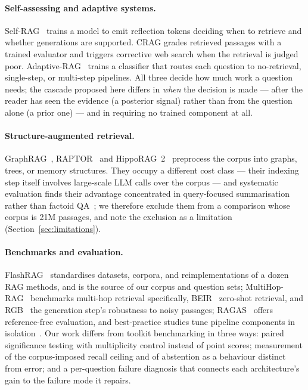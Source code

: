 \paragraph{Self-assessing and adaptive systems.}
Self-RAG~\cite{asai2024selfrag} trains a model to emit reflection tokens
deciding when to retrieve and whether generations are supported. CRAG
\cite{yan2024crag} grades retrieved passages with a trained evaluator and
triggers corrective web search when the retrieval is judged poor.
Adaptive-RAG~\cite{jeong2024adaptiverag} trains a classifier that routes
each question to no-retrieval, single-step, or multi-step pipelines. All
three decide how much work a question needs; the cascade proposed here
differs in \emph{when} the decision is made --- after the reader has seen
the evidence (a posterior signal) rather than from the question alone (a
prior one) --- and in requiring no trained component at all.

\paragraph{Structure-augmented retrieval.}
GraphRAG~\cite{edge2024graphrag}, RAPTOR~\cite{sarthi2024raptor} and
HippoRAG~2~\cite{gutierrez2025hipporag2} preprocess the corpus into graphs,
trees, or memory structures. They occupy a different cost class --- their
indexing step itself involves large-scale LLM calls over the corpus --- and
systematic evaluation finds their advantage concentrated in query-focused
summarisation rather than factoid QA~\cite{han2025ragvsgraphrag}; we
therefore exclude them from a comparison whose corpus is 21M passages, and
note the exclusion as a limitation (Section~\ref{sec:limitations}).

\paragraph{Benchmarks and evaluation.}
FlashRAG~\cite{jin2024flashrag} standardises datasets, corpora, and
reimplementations of a dozen RAG methods, and is the source of our corpus
and question sets; MultiHop-RAG~\cite{tang2024multihoprag} benchmarks
multi-hop retrieval specifically, BEIR~\cite{thakur2021beir} zero-shot
retrieval, and RGB~\cite{chen2024benchmarking} the generation step's
robustness to noisy passages; RAGAS~\cite{es2024ragas} offers
reference-free evaluation, and best-practice studies tune pipeline
components in isolation~\cite{wang2024bestpractices}. Our work differs
from toolkit
benchmarking in three ways: paired significance testing with multiplicity
control instead of point scores; measurement of the corpus-imposed recall
ceiling and of abstention as a behaviour distinct from error; and a
per-question failure diagnosis that connects each architecture's gain to
the failure mode it repairs.

